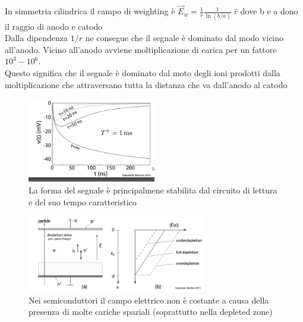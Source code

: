 In simmetria cilindrica il campo di weighting è $\vec{E}_w=\frac{1}{r}\frac{1}{\ln(b/a)} \; \hat{r}$ dove b e a dono il raggio di anodo e catodo
\\ 
Dalla dipendenza $1/r$ ne consegue che il segnale è dominato dal modo vicino all'anodo.
Vicino all'anodo avviene moltiplicazione di carica per un fattore $10^3-10^6$. 
\\ 
Questo significa che il segnale è dominato dal moto degli ioni prodotti dalla moltiplicazione che attraversano tutta la distanza che va dall'anodo al catodo
\begin{figure}[H]
    \centering
    \includegraphics[width=0.5\textwidth,frame]{Chapters/images/Interazione_radiazione_materia/image-20220223213221551.png}
    \captionsetup{width=0.5\textwidth}
    \caption{La forma del segnale è principalmene stabilita dal circuito di lettura e del suo tempo caratteristico}
\end{figure}


\begin{figure}[H]
    \centering
    \includegraphics[width=0.7\textwidth,frame]{Chapters/images/Interazione_radiazione_materia/image-20220223213733948.png}
    \captionsetup{width=0.9\textwidth}
    \caption{Nei semiconduttori il campo elettrico non è costante a causa della presenza di molte cariche spaziali (soprattutto nella depleted zone)}
\end{figure}


